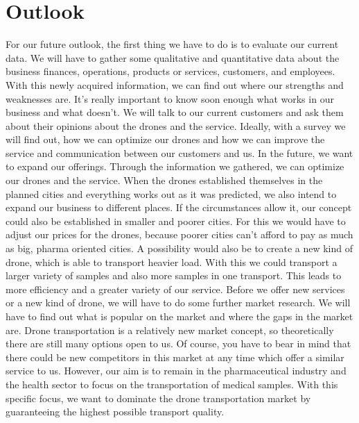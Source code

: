 \chapter{Outlook} \label{outlook}
For our future outlook, the first thing we have to do is to evaluate our current data. We will have to gather some qualitative and quantitative data about the business finances, operations, products or services, customers, and employees. With this newly acquired information, we can find out where our strengths and weaknesses are. It's really important to know soon enough what works in our business and what doesn't. We will talk to our current customers and ask them about their opinions about the drones and the service. Ideally, with a survey we will find out, how we can optimize our drones and how we can improve the service and communication between our customers and us. In the future, we want to expand our offerings. Through the information we gathered, we can optimize our drones and the service. When the drones established themselves in the planned cities and everything works out as it was predicted, we also intend to expand our business to different places. If the circumstances allow it, our concept could also be established in smaller and poorer cities. For this we would have to adjust our prices for the drones, because poorer cities can't afford to pay as much as big, pharma oriented cities. A possibility would also be to create a new kind of drone, which is able to transport heavier load. With this we could transport a larger variety of samples and also more samples in one transport. This leads to more efficiency and a greater variety of our service.
\newline
Before we offer new services or a new kind of drone, we will have to do some further market research. We will have to find out what is popular on the market and where the gaps in the market are. Drone transportation is a relatively new market concept, so theoretically there are still many options open to us. Of course, you have to bear in mind that there could be new competitors in this market at any time which offer a similar service to us. However, our aim is to remain in the pharmaceutical industry and the health sector to focus on the transportation of medical samples. With this specific focus, we want to dominate the drone transportation market by guaranteeing the highest possible transport quality.
\newline
